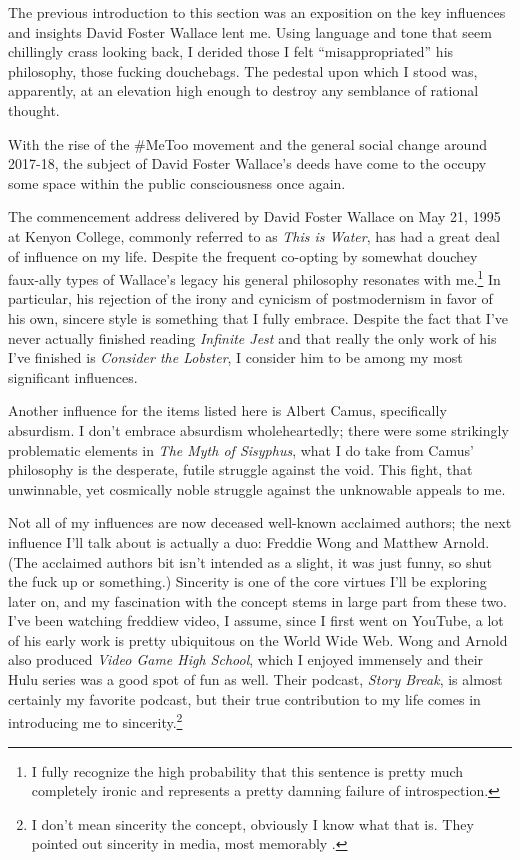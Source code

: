 \documentclass[../butidigress.tex]{subfiles}
\begin{document}
\label{sec:influences}
The previous introduction to this section was an exposition on the key influences and insights David Foster Wallace lent me.
Using language and tone that seem chillingly crass looking back, I derided those I felt ``misappropriated'' his philosophy, those fucking douchebags.
The pedestal upon which I stood was, apparently, at an elevation high enough to destroy any semblance of rational thought.

With the rise of the \#MeToo movement and the general social change around 2017-18, the subject of David Foster Wallace's deeds have come to the occupy some space within the public consciousness once again.

The commencement address delivered by David Foster Wallace on May 21, 1995 at Kenyon College, commonly referred to as \textit{This is Water}, has had a great deal of influence on my life.
Despite the frequent co-opting by somewhat douchey faux-ally types of Wallace's legacy his general philosophy resonates with me.\footnote{I fully recognize the high probability that this sentence is pretty much completely ironic and represents a pretty damning failure of introspection.}
In particular, his rejection of the irony and cynicism of postmodernism in favor of his own, sincere style is something that I fully embrace.
Despite the fact that I've never actually finished reading \textit{Infinite Jest} and that really the only work of his I've finished is \textit{Consider the Lobster}, I consider him to be among my most significant influences.


Another influence for the items listed here is Albert Camus, specifically absurdism.
I don't embrace absurdism wholeheartedly; there were some strikingly problematic elements in \textit{The Myth of Sisyphus}, what I do take from Camus' philosophy is the desperate, futile struggle against the void.
This fight, that unwinnable, yet cosmically noble struggle against the unknowable appeals to me.

Not all of my influences are now deceased well-known acclaimed authors; the next influence I'll talk about is actually a duo: Freddie Wong and Matthew Arnold.
(The acclaimed authors bit isn't intended as a slight, it was just funny, so shut the fuck up or something.)
Sincerity is one of the core virtues I'll be exploring later on, and my fascination with the concept stems in large part from these two.
I've been watching freddiew video, I assume, since I first went on YouTube, a lot of his early work is pretty ubiquitous on the World Wide Web.
Wong and Arnold also produced \textit{Video Game High School}, which I enjoyed immensely and their Hulu series was a good spot of fun as well.
Their podcast, \textit{Story Break}, is almost certainly my favorite podcast, but their true contribution to my life comes in introducing me to sincerity.\footnote{I don't mean sincerity the concept, obviously I know what that is. They pointed out sincerity in media, most memorably .}
\end{document}
